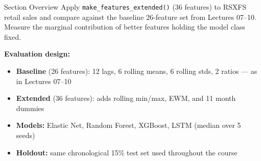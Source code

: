 \documentclass[aspectratio=169, 10pt]{beamer}
\begin{document}

\begin{frame}{Section Overview}
  Apply \texttt{make\_features\_extended()} (36 features) to
  RSXFS retail sales and compare against the baseline 26-feature
  set from Lectures 07--10. Measure the marginal contribution of
  better features holding the model class fixed.

  \medskip
  \textbf{Evaluation design:}
  \begin{itemize}
    \item \textbf{Baseline} (26 features): 12 lags, 6 rolling
          means, 6 rolling stds, 2 ratios --- as in Lectures 07--10
    \item \textbf{Extended} (36 features): adds rolling min/max,
          EWM, and 11 month dummies
    \item \textbf{Models:} Elastic Net, Random Forest, XGBoost,
          LSTM (median over 5 seeds)
    \item \textbf{Holdout:} same chronological 15\% test set
          used throughout the course
  \end{itemize}
\end{frame}
\end{document}
